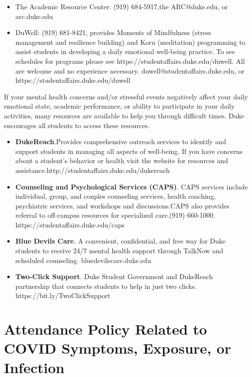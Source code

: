 \documentclass[12pt]{article}
\begin{document}
\begin{itemize}
	\item The Academic Resource Center: (919) 684-5917,the ARC@duke.edu, or arc.duke.edu
	\item DuWell: (919) 681-8421, provides Moments of Mindfulness (stress management and resilience building) and Koru (meditation) programming to assist students in developing a daily emotional well-being practice. To see schedules for programs please see https://studentaffairs.duke.edu/duwell. All are welcome and no experience necessary. duwell@studentaffairs.duke.edu, or https://studentaffairs.duke.edu/duwell
\end{itemize}

If your mental health concerns and/or stressful events negatively affect your daily emotional state, academic performance, or ability to participate in your daily activities, many resources are available to help you through difficult times. Duke encourages all students to access these resources.

\begin{itemize}
	\item \textbf{DukeReach}.Provides comprehensive outreach services to identify and support students in managing all aspects of well-being. If you have concerns about a student's behavior or health visit the website for resources and assistance.http://studentaffairs.duke.edu/dukereach
	\item \textbf{Counseling and Psychological Services (CAPS)}. CAPS services include individual, group, and couples counseling services, health coaching, psychiatric services, and workshops and discussions.CAPS also provides referral to off-campus resources for specialized care.(919) 660-1000. https://studentaffairs.duke.edu/caps
	\item \textbf{Blue Devils Care}. A convenient, confidential, and free way for Duke students to receive 24/7 mental health support through TalkNow and scheduled counseling. bluedevilscare.duke.edu
	\item \textbf{Two-Click Support}. Duke Student Government and DukeReach partnership that connects students to help in just two clicks.  https://bit.ly/TwoClickSupport
\end{itemize}

\section{Attendance Policy Related to COVID Symptoms, Exposure, or Infection}
\end{document}
